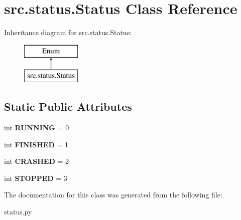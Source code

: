 \hypertarget{classsrc_1_1status_1_1_status}{}\section{src.\+status.\+Status Class Reference}
\label{classsrc_1_1status_1_1_status}
Inheritance diagram for src.\+status.\+Status\+:\begin{figure}[H]
\begin{center}
\leavevmode
\includegraphics[height=2.000000cm]{classsrc_1_1status_1_1_status}
\end{center}
\end{figure}
\subsection*{Static Public Attributes}
\begin{DoxyCompactItemize}
\item 
\mbox{\label{classsrc_1_1status_1_1_status_a0677342a89262926ba4b62e5ee45d18e}} 
int {\bfseries R\+U\+N\+N\+I\+NG} = 0
\item 
\mbox{\label{classsrc_1_1status_1_1_status_ab83b5d2ef99371968c6ddafcee0d9d60}} 
int {\bfseries F\+I\+N\+I\+S\+H\+ED} = 1
\item 
\mbox{\label{classsrc_1_1status_1_1_status_ad2701177cd592015f2d425889dbec315}} 
int {\bfseries C\+R\+A\+S\+H\+ED} = 2
\item 
\mbox{\label{classsrc_1_1status_1_1_status_af9f5483bfd7a5534cb7b7f786324bbda}} 
int {\bfseries S\+T\+O\+P\+P\+ED} = 3
\end{DoxyCompactItemize}


The documentation for this class was generated from the following file\+:\begin{DoxyCompactItemize}
\item 
status.\+py\end{DoxyCompactItemize}
